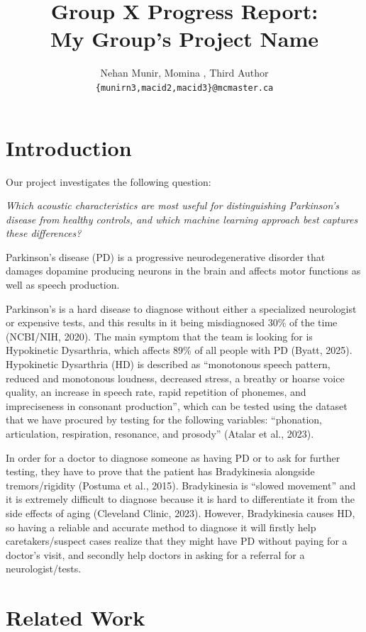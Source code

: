 \documentclass[11pt]{article}
\title{Group X Progress Report:\\My Group's Project Name}
\author{Nehan Munir, Momina , Third Author \\
  \texttt{\{munirn3,macid2,macid3\}@mcmaster.ca} }
\begin{document}
\maketitle

\section{Introduction}

Our project investigates the following question: 

\textit{Which acoustic characteristics are most useful for distinguishing Parkinson's disease from healthy controls, and which machine learning approach best captures these differences?}

Parkinson’s disease (PD) is a progressive neurodegenerative disorder that damages dopamine producing neurons in the brain and affects motor functions as well as speech production.


Parkinson’s is a hard disease to diagnose without either a specialized neurologist or expensive tests, and this results in it being misdiagnosed 30\% of the time (NCBI/NIH, 2020). The main symptom that the team is looking for is Hypokinetic Dysarthria, which affects 89\% of all people with PD (Byatt, 2025). Hypokinetic Dysarthria (HD) is described as “monotonous speech pattern, reduced and monotonous loudness, decreased stress, a breathy or hoarse voice quality, an increase in speech rate, rapid repetition of phonemes, and impreciseness in consonant production”, which can be tested using the dataset that we have procured by testing for the following variables: “phonation, articulation, respiration, resonance, and prosody” (Atalar et al., 2023).


In order for a doctor to diagnose someone as having PD or to ask for further testing, they have to prove that the patient has Bradykinesia alongside tremors/rigidity (Postuma et al., 2015). Bradykinesia is “slowed movement” and it is extremely difficult to diagnose because it is hard to differentiate it from the side effects of aging (Cleveland Clinic, 2023). However, Bradykinesia causes HD, so having a reliable and accurate method to diagnose it will firstly help caretakers/suspect cases realize that they might have PD without paying for a doctor’s visit, and secondly help doctors in asking for a referral for a neurologist/tests. 

\section{Related Work}
\end{document}
